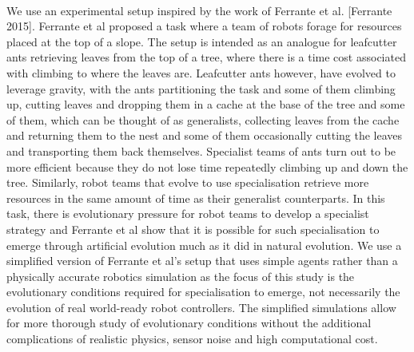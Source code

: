 \documentclass[sigconf]{aamas}  %
\begin{document}
\paragraph{}
We use an experimental setup inspired by the work of Ferrante et al. [Ferrante 2015]. 
Ferrante et al proposed a task where a team of robots forage for resources placed at the top of a slope. 
The setup is intended as an analogue for leafcutter ants retrieving leaves from the top of a tree, where there is a time cost associated with climbing to where the leaves are.
 Leafcutter ants however, have evolved to leverage gravity, with the ants partitioning the task and some of them climbing up, cutting leaves and dropping them in a cache at the base of the tree and some of them, which can be thought of as generalists, collecting leaves from the cache and returning them to the nest and some of them occasionally cutting the leaves and transporting them back themselves. 
 Specialist teams of ants turn out to be more efficient because they do not lose time repeatedly climbing up and down the tree. 
 Similarly, robot teams that evolve to use specialisation retrieve more resources in the same amount of time as their generalist counterparts. 
 In this task, there is evolutionary pressure for robot teams to develop a specialist strategy and Ferrante et al show that it is possible for such specialisation to emerge through artificial evolution much as it did in natural evolution. 
 We use a simplified version of Ferrante et al's setup that uses simple agents rather than a physically accurate robotics simulation as the focus of this study is the evolutionary conditions required for specialisation to emerge, not necessarily the evolution of real world-ready robot controllers. 
 The simplified simulations allow for more thorough study of evolutionary conditions without the additional complications of realistic physics, sensor noise and high computational cost.
\end{document}
